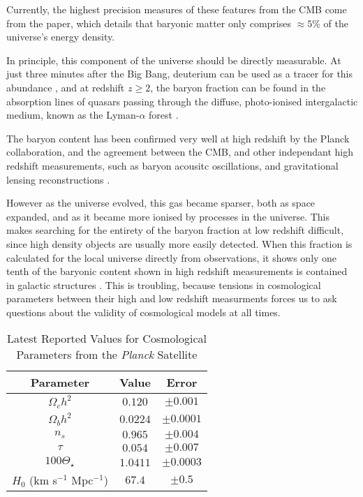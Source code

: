 Currently, the highest precision measures of these features from the CMB come from the  \cite{2018arXiv180706209P} paper, which details that baryonic matter only comprises $\approx 5 \% $ of the universe's energy density. 

\par In principle, this component of the universe should be directly measurable. At just three minutes after the Big Bang, deuterium can be used as a tracer for this abundance \citep{2007ARNPS..57..463S}, and at redshift $z \geqslant 2$, the baryon fraction can be found in the absorption lines of quasars passing through the diffuse, photo-ionised intergalactic medium, known as the Lyman-$\alpha$ forest \citep{1997ApJ...490..564W}. 

\par The baryon content has been confirmed very well at high redshift by the Planck collaboration, and the agreement between the CMB, and other independant high redshift measurements, such as baryon acousitc oscillations, and gravitational lensing reconstructions .  

\par However as the universe evolved, this gas became sparser, both as space expanded, and as it became more ionised by processes in the universe. This makes searching for the entirety of the baryon fraction at low redshift difficult, since high density objects are usually more easily detected. When this fraction is calculated for the local universe directly from observations, it shows only one tenth of the baryonic content shown in high redshift measurements is contained in galactic structures \citep{1992MNRAS.258P..14P}. This is troubling, because tensions in cosmological parameters between their high and low redshift measurments forces us to ask questions about the validity of cosmological models at all times.

\begin{table}
\centering
\begin{tabular}{||c c c||} 
 \hline
 Parameter & Value & Error \\
 \hline\hline
 $\Omega_c h^2$ & $0.120$ & $\pm 0.001$ \\
 \hline
 $\Omega_b h^2$ & $0.0224$ & $\pm 0.0001$ \\
 \hline
  $n_s$ & $0.965$ & $\pm 0.004$ \\
 \hline
  $\tau$  & $0.054$ & $\pm 0.007$ \\
 \hline
  $100 \Theta_\star$ & $1.0411$ & $\pm 0.0003$ \\
 \hline
 $H_0$ (km s$^{-1}$ Mpc$^{-1}$) & $67.4$ & $\pm 0.5$ \\
 \hline

\end{tabular}
\caption{Latest Reported Values for Cosmological Parameters from the \emph{Planck} Satellite \citep{2018arXiv180706209P}}
\label{table:params}
\end{table}




